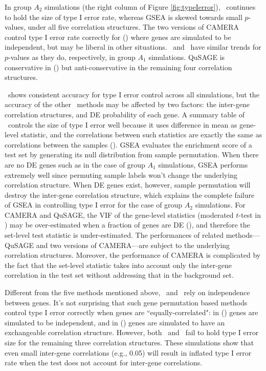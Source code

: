 	In group $A_2$ simulations (the right column of Figure \ref{fig:typeIerror}),  
	\OurMethod~continues
	to hold the size of type I error rate, whereas GSEA is skewed towards small $p$-values, under 
	all
	five correlation structures. The two versions of CAMERA control type I error rate correctly for
	(\aaCase) where genes are simulated to be independent, but may be liberal in other situations.
	\gent~and \genr~have similar trends for $p$-values as they do, respectively, in group $A_1$
	simulations. QuSAGE is conservative in (\cCase) but anti-conservative in the remaining four
	correlation structures.
	
	\OurMethod~shows consistent accuracy for type I error control across all simulations, but the
	accuracy of the other \HowmanyTest~methods may be affected by two factors: the inter-gene
	correlation structures, and DE probability of each gene. A summary table of  
	\OurMethod~controls the size of type I
	error well because it uses difference in mean as gene-level statistic, and the correlations 
	between
	such statistics are exactly the same as correlations between the samples 
	(\thepapertobefinished).
	GSEA evaluates the enrichment score
	of a test set by generating its null distribution from sample permutation. When there are no DE 
	genes
	such as in the case of group $A_1$ simulations, GSEA performs extremely well since permuting 
	sample
	labels won't change the underlying correlation structure. When DE genes exist, however, sample
	permutation will destroy the inter-gene correlation structure, which explains the complete 
	failure
	of GSEA in controlling type I error for the case of group $A_2$ simulations. For CAMERA and 
	QuSAGE,
	the VIF of the gene-level statistics (moderated $t$-test in \cite{wu2012camera}) may be
	over-estimated when a fraction of genes are DE (\thepapertobefinished), and therefore the 
	set-level
	test statistic is under-estimated. The performances of related methods---QuSAGE and two 
	versions of
	CAMERA---are subject to the underlying correlation structures. 
	Moreover, the performance of CAMERA is complicated by the fact that the set-level statistic 
	takes into account only the inter-gene correlation in the test set without addressing that in 
	the	background set.
	
	Different from the five methods mentioned above, \gent~and \genr~rely on independence between
	genes. It's not surprising that such gene permutation based methods control type I
	error correctly when genes are ``equally-correlated": in (\aaCase) genes are simulated to be
	independent, and in (\cCase) genes are simulated to have an exchangeable correlation structure.
	However, both \gent~and \genr~fail to hold type I error size for the remaining three correlation
	structures. These simulations show that even small inter-gene correlations (e.g., 0.05) will 
	result in inflated type I error rate when the test does not account for inter-gene 
	correlations.  
	
